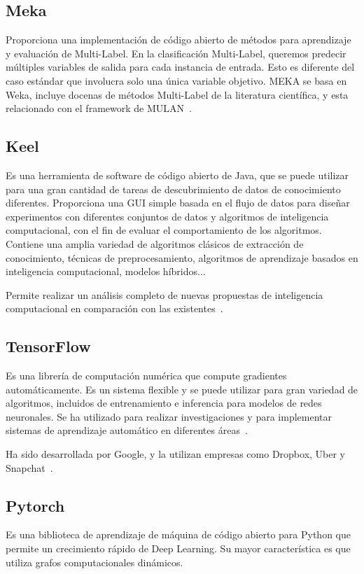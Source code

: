 \subsection{Meka}
Proporciona una implementación de código abierto de métodos para aprendizaje y evaluación de Multi-Label. En la clasificación Multi-Label, queremos predecir múltiples variables de salida para cada instancia de entrada. Esto es diferente del caso estándar que involucra solo una única variable objetivo. MEKA se basa en Weka, incluye docenas de métodos Multi-Label de la literatura científica, y esta relacionado con el framework de MULAN~\cite{meka}.

\subsection{Keel}
Es una herramienta de software de código abierto de Java, que se puede utilizar para una gran cantidad de tareas de descubrimiento de datos de conocimiento diferentes. Proporciona una GUI simple basada en el flujo de datos para diseñar experimentos con diferentes conjuntos de datos y algoritmos de inteligencia computacional, con el fin de evaluar el comportamiento de los algoritmos. Contiene una amplia variedad de algoritmos clásicos de extracción de conocimiento, técnicas de preprocesamiento, algoritmos de aprendizaje basados en inteligencia computacional, modelos híbridos...

Permite realizar un análisis completo de nuevas propuestas de inteligencia computacional en comparación con las existentes~\cite{keel}.

\subsection{TensorFlow}
Es una librería de computación numérica que compute gradientes automáticamente. Es un sistema flexible y se puede utilizar para gran variedad de algoritmos, incluidos de entrenamiento e inferencia para modelos de redes neuronales. Se ha utilizado para realizar investigaciones y para implementar sistemas de aprendizaje automático en diferentes áreas~\cite{tensorflow}.

Ha sido desarrollada por Google, y la utilizan empresas como Dropbox, Uber y Snapchat~\cite{libraries}.

\subsection{Pytorch}
Es una biblioteca de aprendizaje de máquina de código abierto para Python que permite un crecimiento rápido de Deep Learning. Su mayor característica es que utiliza grafos computacionales dinámicos.

